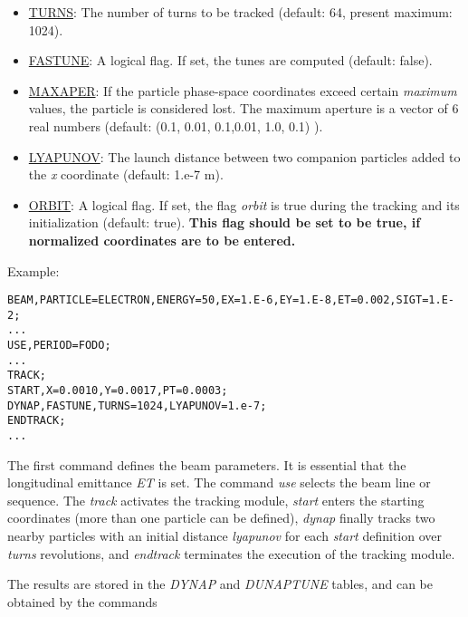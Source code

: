\begin{itemize}
	\item \href{particle}{TURNS}:
 The number of turns to be tracked (default: 64, present maximum: 1024).
 
	\item \href{particle}{FASTUNE}:
 A logical flag. If set, the tunes are computed (default: false).
 
	\item \href{particle}{MAXAPER}:
 If the particle phase-space coordinates exceed certain 
 \textit{ maximum }
 values, the particle is considered lost. The maximum aperture
 is a vector of 6 real numbers 
 (default: (0.1, 0.01, 0.1,0.01, 1.0, 0.1) ).
 
	\item \href{particle}{LYAPUNOV}:
 The launch distance 
 between two companion particles 
 added to the \textit{x} coordinate (default: 1.e-7 m).
 
	\item \href{particle}{ORBIT}:
 A logical flag. If set, the flag \textit{orbit} 
 is true during the tracking and its initialization
 (default: true).
 \textbf{ This flag should be set to be true, if 
 normalized coordinates are to be entered.}
\end{itemize}


 Example:
 
\begin{verbatim}
BEAM,PARTICLE=ELECTRON,ENERGY=50,EX=1.E-6,EY=1.E-8,ET=0.002,SIGT=1.E-2;
...
USE,PERIOD=FODO;
...
TRACK;
START,X=0.0010,Y=0.0017,PT=0.0003;
DYNAP,FASTUNE,TURNS=1024,LYAPUNOV=1.e-7;
ENDTRACK;
...

\end{verbatim}
 The first command defines the beam parameters. It is 
 essential that the longitudinal emittance \textit{ET}
 is set. The command \textit{use} selects the beam line
 or sequence. The \textit{track} activates the tracking
 module, \textit{start } enters the starting coordinates
 (more than one particle can be defined), 
 \textit{dynap} finally tracks two nearby particles 
 with an initial distance \textit{lyapunov} 
 for each \textit{start} definition over \textit{ turns }
 revolutions, and \textit{endtrack} terminates
 the execution of the tracking module.
 
 
 


 The results are stored in the \textit{DYNAP} and 
 \textit{ DUNAPTUNE } tables, and can be obtained by the commands 
 
